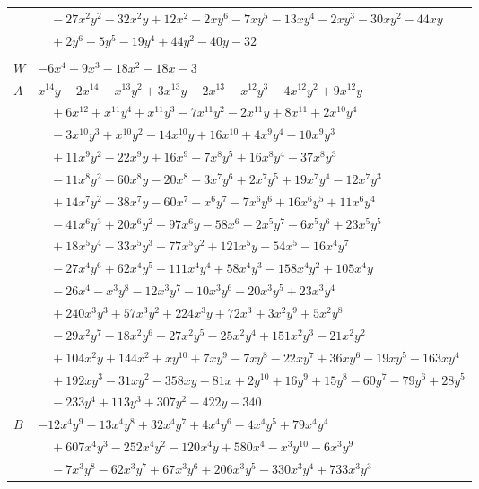 \documentclass[11pt]{article}
\begin{document}
\begin{longtable}{@{}ll@{}}
 & $\quad -27x^{2}y^{2}-32x^{2}y+12x^{2}-2xy^{6}-7xy^{5}-13xy^{4}-2xy^{3}-30xy^{2}-44xy$\\
 & $\quad +2y^{6}+5y^{5}-19y^{4}+44y^{2}-40y-32$\\
\addlinespace[3pt]
\multicolumn{2}{@{}l}{$i=2$, $m=1$, neighbours $9,10,14,16,17,18,19,21,24,25,28,34$}\\
$W$ & $-6x^{4}-9x^{3}-18x^{2}-18x-3$\\
$A$ & $x^{14}y-2x^{14}-x^{13}y^{2}+3x^{13}y-2x^{13}-x^{12}y^{3}-4x^{12}y^{2}+9x^{12}y$\\
 & $\quad +6x^{12}+x^{11}y^{4}+x^{11}y^{3}-7x^{11}y^{2}-2x^{11}y+8x^{11}+2x^{10}y^{4}$\\
 & $\quad -3x^{10}y^{3}+x^{10}y^{2}-14x^{10}y+16x^{10}+4x^{9}y^{4}-10x^{9}y^{3}$\\
 & $\quad +11x^{9}y^{2}-22x^{9}y+16x^{9}+7x^{8}y^{5}+16x^{8}y^{4}-37x^{8}y^{3}$\\
 & $\quad -11x^{8}y^{2}-60x^{8}y-20x^{8}-3x^{7}y^{6}+2x^{7}y^{5}+19x^{7}y^{4}-12x^{7}y^{3}$\\
 & $\quad +14x^{7}y^{2}-38x^{7}y-60x^{7}-x^{6}y^{7}-7x^{6}y^{6}+16x^{6}y^{5}+11x^{6}y^{4}$\\
 & $\quad -41x^{6}y^{3}+20x^{6}y^{2}+97x^{6}y-58x^{6}-2x^{5}y^{7}-6x^{5}y^{6}+23x^{5}y^{5}$\\
 & $\quad +18x^{5}y^{4}-33x^{5}y^{3}-77x^{5}y^{2}+121x^{5}y-54x^{5}-16x^{4}y^{7}$\\
 & $\quad -27x^{4}y^{6}+62x^{4}y^{5}+111x^{4}y^{4}+58x^{4}y^{3}-158x^{4}y^{2}+105x^{4}y$\\
 & $\quad -26x^{4}-x^{3}y^{8}-12x^{3}y^{7}-10x^{3}y^{6}-20x^{3}y^{5}+23x^{3}y^{4}$\\
 & $\quad +240x^{3}y^{3}+57x^{3}y^{2}+224x^{3}y+72x^{3}+3x^{2}y^{9}+5x^{2}y^{8}$\\
 & $\quad -29x^{2}y^{7}-18x^{2}y^{6}+27x^{2}y^{5}-25x^{2}y^{4}+151x^{2}y^{3}-21x^{2}y^{2}$\\
 & $\quad +104x^{2}y+144x^{2}+xy^{10}+7xy^{9}-7xy^{8}-22xy^{7}+36xy^{6}-19xy^{5}-163xy^{4}$\\
 & $\quad +192xy^{3}-31xy^{2}-358xy-81x+2y^{10}+16y^{9}+15y^{8}-60y^{7}-79y^{6}+28y^{5}$\\
 & $\quad -233y^{4}+113y^{3}+307y^{2}-422y-340$\\
$B$ & $-12x^{4}y^{9}-13x^{4}y^{8}+32x^{4}y^{7}+4x^{4}y^{6}-4x^{4}y^{5}+79x^{4}y^{4}$\\
 & $\quad +607x^{4}y^{3}-252x^{4}y^{2}-120x^{4}y+580x^{4}-x^{3}y^{10}-6x^{3}y^{9}$\\
 & $\quad -7x^{3}y^{8}-62x^{3}y^{7}+67x^{3}y^{6}+206x^{3}y^{5}-330x^{3}y^{4}+733x^{3}y^{3}$\\

\end{longtable}
\end{document}
